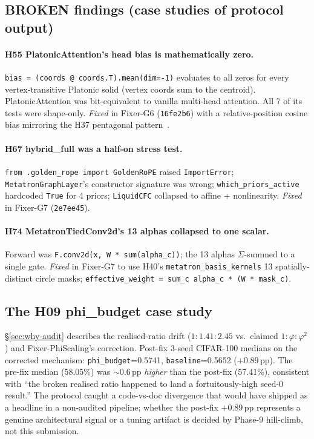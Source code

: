 \documentclass{article}
\begin{document}
\subsection{BROKEN findings (case studies of protocol output)}
\label{sec:broken}

\paragraph{H55 PlatonicAttention's head bias is mathematically zero.}
\texttt{bias = (coords @ coords.T).mean(dim=-1)} evaluates to all
zeros for every vertex-transitive Platonic solid (vertex coords sum
to the centroid). PlatonicAttention was bit-equivalent to vanilla
multi-head attention. All 7 of its tests were shape-only. \emph{Fixed}
in Fixer-G6 (\texttt{16fe2b6}) with a relative-position cosine bias
mirroring the H37 pentagonal pattern~\citep{islam2025platonic}.

\paragraph{H67 hybrid\_full was a half-on stress test.}
\texttt{from .golden\_rope import GoldenRoPE} raised
\texttt{ImportError}; \texttt{MetatronGraphLayer}'s constructor
signature was wrong; \texttt{which\_priors\_active} hardcoded
\texttt{True} for 4 priors; \texttt{LiquidCFC} collapsed to affine +
nonlinearity. \emph{Fixed} in Fixer-G7 (\texttt{2e7ee45}).

\paragraph{H74 MetatronTiedConv2d's 13 alphas collapsed to one scalar.}
Forward was \texttt{F.conv2d(x, W * sum(alpha\_c))}; the 13 alphas
$\Sigma$-summed to a single gate. \emph{Fixed} in Fixer-G7 to use
H40's \texttt{metatron\_basis\_kernels} 13 spatially-distinct circle
masks; \texttt{effective\_weight = sum\_c alpha\_c * (W * mask\_c)}.

\subsection{The H09 phi\_budget case study}
\label{sec:h09}

\S\ref{sec:why-audit} describes the realised-ratio drift
($1{:}1.41{:}2.45$ vs.\ claimed $1{:}\varphi{:}\varphi^2$) and
Fixer-PhiScaling's correction. Post-fix 3-seed CIFAR-100 medians on
the corrected mechanism: \texttt{phi\_budget}=0.5741,
\texttt{baseline}=0.5652 ($+0.89$\,pp). The pre-fix median (58.05\%)
was $\sim 0.6$\,pp \emph{higher} than the post-fix (57.41\%),
consistent with ``the broken realised ratio happened to land a
fortuitously-high seed-0 result.'' The protocol caught a code-vs-doc
divergence that would have shipped as a headline in a non-audited
pipeline; whether the post-fix $+0.89$\,pp represents a genuine
architectural signal or a tuning artifact is decided by Phase-9
hill-climb, not this submission.
\end{document}
